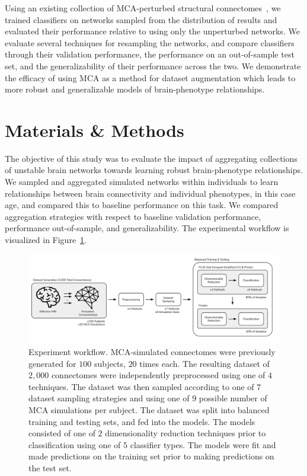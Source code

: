 \documentclass[10pt]{SelfArx} %
\begin{document}
Using an existing collection of MCA-perturbed structural connectomes~\cite{Kiar2020-yz}, we trained classifiers on
networks sampled from the distribution of results and evaluated their performance relative to using only the
unperturbed networks. We evaluate several techniques for resampling the networks, and compare classifiers through their
validation performance, the performance on an out-of-sample test set, and the generalizability of their performance
across the two. We demonstrate the efficacy of using MCA as a method for dataset augmentation which leads to more
robust and generalizable models of brain-phenotype relationships.


\section*{Materials \& Methods}

The objective of this study was to evaluate the impact of aggregating collections of unstable brain networks towards
learning robust brain-phenotype relationships. We sampled and aggregated simulated networks within individuals to learn
relationships between brain connectivity and individual phenotypes, in this case age, and compared this to baseline
performance on this task. We compared aggregation strategies with respect to baseline validation performance,
performance out-of-sample, and generalizability. The experimental workflow is visualized in Figure~\ref{fig:workflow}.

\begin{figure}[bth!]\centering
\includegraphics[width=\linewidth]{figures/0.pdf}
\caption{Experiment workflow. MCA-simulated connectomes were previously generated for $100$ subjects, $20$ times each.
The resulting dataset of $2,000$ connectomes were independently preprocessed using one of $4$ techniques. The dataset
was then sampled according to one of $7$ dataset sampling strategies and using one of $9$ possible number of MCA
simulations per subject. The dataset was split into balanced training and testing sets, and fed into the models. The
models consisted of one of $2$ dimensionality reduction techniques prior to classification using one of $5$ classifier
types. The models were fit and made predictions on the training set prior to making predictions on the test set.}
\label{fig:workflow}
\end{figure}
\end{document}
